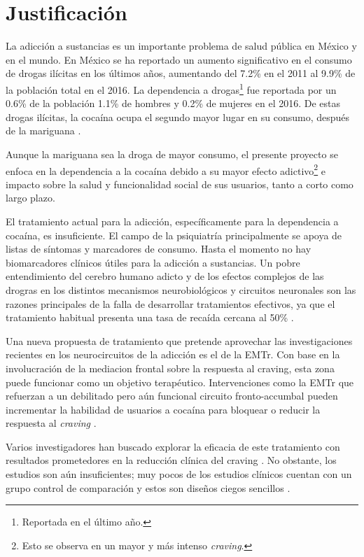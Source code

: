 \section{Justificación}
La adicción a sustancias es un importante problema de salud pública en México y en el mundo.
En México se ha reportado un aumento significativo en el consumo de drogas ilícitas en los últimos años, aumentando del 7.2\% en el 2011 al 9.9\% de la población total en el 2016.
La dependencia a drogas\footnote{Reportada en el último año.} fue reportada por un 0.6\% de la población \textemdash{}1.1\% de hombres y 0.2\% de mujeres en el 2016.
De estas drogas ilícitas, la cocaína ocupa el segundo mayor lugar en su consumo, después de la mariguana \parencite{Villatoro-Velazques2017}.\par
Aunque la mariguana sea la droga de mayor consumo, el presente proyecto se enfoca en la dependencia a la cocaína debido a su mayor efecto adictivo\footnote{Esto se observa en un mayor y más intenso \textit{craving}.} e impacto sobre la salud y funcionalidad social de sus usuarios, tanto a corto como largo plazo. \par
El tratamiento actual para la adicción, específicamente para la dependencia a cocaína, es insuficiente.
El campo de la psiquiatría principalmente se apoya de listas de síntomas y marcadores de consumo.
Hasta el momento no hay biomarcadores clínicos útiles para la adicción a sustancias.
Un pobre entendimiento del cerebro humano adicto y de los efectos complejos de las drogras en los distintos mecanismos neurobiológicos y circuitos neuronales son las razones principales de la falla de desarrollar tratamientos efectivos, ya que el tratamiento habitual presenta una tasa de recaída cercana al 50\% \parencite{McLellan2000a}. \par
Una nueva propuesta de tratamiento que pretende aprovechar las investigaciones recientes en los neurocircuitos de la adicción es el de la EMTr.
Con base en la involucración de la mediacion frontal sobre la respuesta al craving, esta zona puede funcionar como un objetivo terapéutico. Intervenciones como la EMTr que refuerzan a un debilitado pero aún funcional circuito fronto-accumbal pueden incrementar la habilidad de usuarios a cocaína para bloquear o reducir la respuesta al \textit{craving} \parencite{Volkow2010a}. \par
Varios investigadores han buscado explorar la eficacia de este tratamiento con resultados prometedores en la reducción clínica del craving \parencite{Rachid2018}.
No obstante, los estudios son aún insuficientes; muy pocos de los estudios clínicos cuentan con un grupo control de comparación y estos son diseños ciegos sencillos \parencite{Kearney-Ramos2018a, Kearney-Ramos2019, Terraneo2016,Hanlon2015}.
